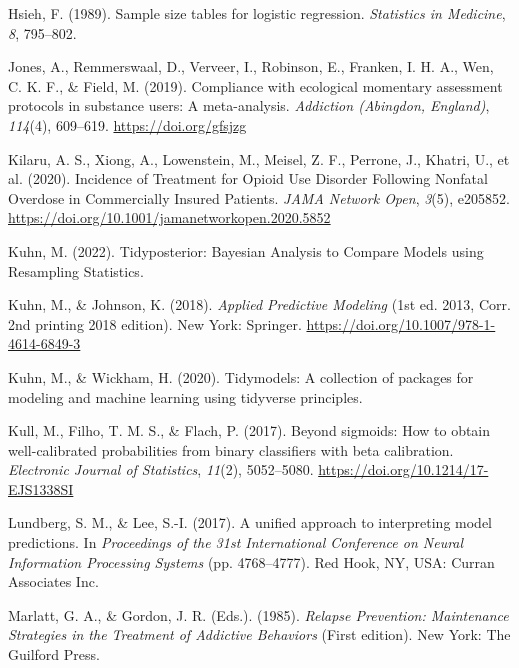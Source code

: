 \documentclass[
]{agujournal2019}
\newlength{\cslhangindent}
\newenvironment{CSLReferences}[2] %
 {\begin{list}{}{%
  \setlength{\itemindent}{0pt}
  \setlength{\leftmargin}{0pt}
  \setlength{\parsep}{0pt}
  \ifodd #1
   \setlength{\leftmargin}{\cslhangindent}
   \setlength{\itemindent}{-1\cslhangindent}
  \fi
  \setlength{\itemsep}{#2\baselineskip}}}
 {\end{list}}
\begin{document}
\begin{CSLReferences}{1}{0}
Hsieh, F. (1989). Sample size tables for logistic regression.
\emph{Statistics in Medicine}, \emph{8}, 795--802.

Jones, A., Remmerswaal, D., Verveer, I., Robinson, E., Franken, I. H.
A., Wen, C. K. F., \& Field, M. (2019). Compliance with ecological
momentary assessment protocols in substance users: A meta-analysis.
\emph{Addiction (Abingdon, England)}, \emph{114}(4), 609--619.
\url{https://doi.org/gfsjzg}

Kilaru, A. S., Xiong, A., Lowenstein, M., Meisel, Z. F., Perrone, J.,
Khatri, U., et al. (2020). Incidence of {Treatment} for {Opioid Use
Disorder Following Nonfatal Overdose} in {Commercially Insured
Patients}. \emph{JAMA Network Open}, \emph{3}(5), e205852.
\url{https://doi.org/10.1001/jamanetworkopen.2020.5852}

Kuhn, M. (2022). Tidyposterior: {Bayesian Analysis} to {Compare Models}
using {Resampling Statistics}.

Kuhn, M., \& Johnson, K. (2018). \emph{Applied {Predictive Modeling}}
(1st ed. 2013, Corr. 2nd printing 2018 edition). New York: Springer.
\url{https://doi.org/10.1007/978-1-4614-6849-3}

Kuhn, M., \& Wickham, H. (2020). Tidymodels: A collection of packages
for modeling and machine learning using tidyverse principles.

Kull, M., Filho, T. M. S., \& Flach, P. (2017). Beyond sigmoids: {How}
to obtain well-calibrated probabilities from binary classifiers with
beta calibration. \emph{Electronic Journal of Statistics}, \emph{11}(2),
5052--5080. \url{https://doi.org/10.1214/17-EJS1338SI}

Lundberg, S. M., \& Lee, S.-I. (2017). A unified approach to
interpreting model predictions. In \emph{Proceedings of the 31st
{International Conference} on {Neural Information Processing Systems}}
(pp. 4768--4777). Red Hook, NY, USA: Curran Associates Inc.

Marlatt, G. A., \& Gordon, J. R. (Eds.). (1985). \emph{Relapse
{Prevention}: {Maintenance Strategies} in the {Treatment} of {Addictive
Behaviors}} (First edition). New York: The Guilford Press.


\end{CSLReferences}
\end{document}
